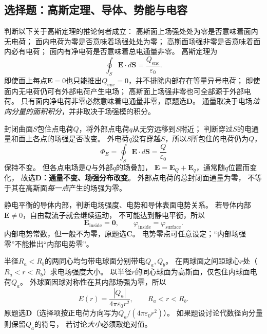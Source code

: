 
\subsection{选择题：高斯定理、导体、势能与电容}

\problemtext 判断以下关于高斯定理的推论何者成立：
高斯面上场强处处为零是否意味着面内无电荷；
面内电荷为零是否意味着场强处处为零；
高斯面场强非零是否意味着面内必有电荷；
面内有净电荷是否意味着总电通量非零。
\workings
高斯定理为
\[
\oint_S\bm E\cdot d\bm S=\frac{Q_{\mathrm{enc}}}{\varepsilon_0}.
\]
即使面上每点$\bm E=0$也只能推出$Q_{\mathrm{enc}}=0$，并不排除内部存在等量异号电荷；
即使面内无电荷仍可有外部电荷产生电场；
高斯面上场强非零也可全部源于外部电荷。
只有面内净电荷非零必然意味着电通量非零，原题选\textbf{D}。
\crosscheck 通量取决于电场\emph{法向分量的面积积分}，并非取决于场强模的积分。

\problemtext 封闭曲面$S$包住点电荷$Q$，将外部点电荷$q$从无穷远移到$S$附近；
判断穿过$S$的电通量和面上各点的场强是否改变。
\workings
外电荷$q$没有穿越$S$，所以$S$所包住的电荷仍为$Q$，
\[
\boxed{\Phi_E=\oint_S\bm E\cdot d\bm S
=\frac{Q}{\varepsilon_0}}
\]
保持不变。
但各点电场是$Q$与外部$q$的场叠加，
$\bm E=\bm E_Q+\bm E_q$，通常随$q$位置而变化，
故选\textbf{D：通量不变、场强分布改变}。
\crosscheck 外部点电荷的总封闭面通量为零，
不等于其在高斯面\emph{每一点}产生的场强为零。

\problemtext 静电平衡的导体内部，判断电场强度、电势和导体表面电势关系。
\workings
若导体内部$\bm E\ne0$，自由载流子就会继续运动，
不可能达到静电平衡，所以
\[
\boxed{\bm E_{\mathrm{inside}}=\bm0,\qquad
\varphi_{\mathrm{inside}}=\varphi_{\mathrm{surface}}}.
\]
内部电势常数，但一般不为零，原题选\textbf{C}。
\crosscheck 电势零点可任意设定；“内部场强零”不能推出“内部电势零”。

\problemtext 半径$R_a<R_b$的两同心均匀带电球面分别带电$Q_a,Q_b$。
在两球面之间距球心$r$处（$R_a<r<R_b$）求电场强度大小。
\workings
以半径$r$的同心球面为高斯面，仅包住内球面电荷$Q_a$。
外球面因球对称性在其内部场强为零，所以
\[
\boxed{E(r)=\frac{|Q_a|}{4\pi\varepsilon_0r^2}},\qquad
R_a<r<R_b.
\]
原题选\textbf{D}（选择项按正电荷方向写为$Q_a/(4\pi\varepsilon_0r^2)$）。
\crosscheck 如果题设讨论代数径向分量则保留$Q_a$的符号，
若讨论\emph{大小}必须取绝对值。

